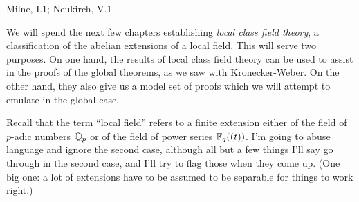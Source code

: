 %
%
%
%
%
%
%

 Milne, I.1; Neukirch, V.1.

\medskip
We will spend the next few chapters establishing \emph{local class field
theory}, a classification of the abelian extensions of a local field. This
will serve two purposes. On one hand, the results of local class field theory
can be used to assist in the proofs of the global theorems, as we saw with
Kronecker-Weber. On the other hand, they also give us a model set of proofs
which we will attempt to emulate in the global case.

Recall that the term ``local field'' refers to a finite extension either
of the field of $p$-adic numbers $\mathbb{Q}_p$ or of the field of power series
$\mathbb{F}_q((t))$. I'm going to abuse language and ignore the second case, although
all but a few things I'll say go through in the second case, and I'll try
to flag those when they come up. (One big one: a lot of extensions have to
be assumed to be separable for things to work right.)

